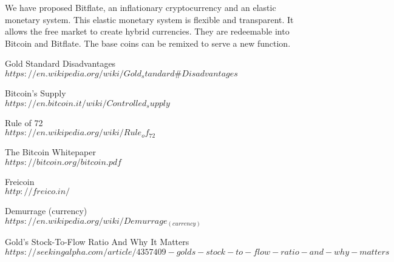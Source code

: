 \documentclass{article}      %
\begin{document}
We have proposed Bitflate, an inflationary cryptocurrency and an elastic monetary system. This elastic monetary system is flexible and transparent. It allows the free market to create hybrid currencies. They are redeemable into Bitcoin and Bitflate. The base coins can be remixed to serve a new function.

\begin{thebibliography}{9}

Gold Standard Disadvantages
\\\texttt{$https://en.wikipedia.org/wiki/Gold_standard\#Disadvantages$}

Bitcoin's Supply
\\\texttt{$https://en.bitcoin.it/wiki/Controlled_supply$}

Rule of 72
\\\texttt{$https://en.wikipedia.org/wiki/Rule_of_72$}

The Bitcoin Whitepaper
\\\texttt{$https://bitcoin.org/bitcoin.pdf$}

Freicoin
\\\texttt{$http://freico.in/$}

Demurrage (currency)
\\\texttt{$https://en.wikipedia.org/wiki/Demurrage_(currency)$}

Gold's Stock-To-Flow Ratio And Why It Matters
\\\texttt{$https://seekingalpha.com/article/4357409-golds-stock-to-flow-ratio-and-why-matters$}

\end{thebibliography}
\end{document}

